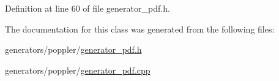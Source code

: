 Definition at line 60 of file generator\+\_\+pdf.\+h.



The documentation for this class was generated from the following files\+:\begin{DoxyCompactItemize}
\item 
generators/poppler/\hyperlink{generator__pdf_8h}{generator\+\_\+pdf.\+h}\item 
generators/poppler/\hyperlink{generator__pdf_8cpp}{generator\+\_\+pdf.\+cpp}\end{DoxyCompactItemize}
